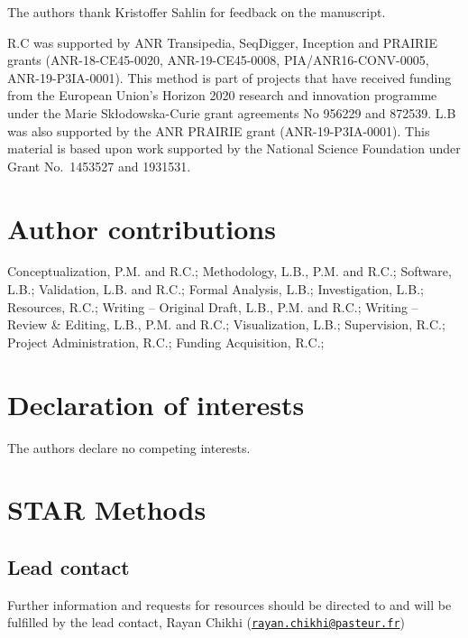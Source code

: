 \documentclass[
  11pt,
  twoside]{scrbook}
\begin{document}
The authors thank Kristoffer Sahlin for feedback on the manuscript.

R.C was supported by ANR Transipedia, SeqDigger, Inception and PRAIRIE grants (ANR-18-CE45-0020, ANR-19-CE45-0008, PIA/ANR16-CONV-0005, ANR-19-P3IA-0001). This method is part of projects that have received funding from the European Union's Horizon 2020 research and innovation programme under the Marie Skłodowska-Curie grant agreements No 956229 and 872539. L.B was also supported by the ANR PRAIRIE grant (ANR-19-P3IA-0001). This material is based upon work supported by the National Science Foundation under Grant No.~1453527 and 1931531.

\hypertarget{author-contributions}{%
\section*{Author contributions}\label{author-contributions}}

Conceptualization, P.M. and R.C.; Methodology, L.B., P.M. and R.C.; Software, L.B.; Validation, L.B. and R.C.; Formal Analysis, L.B.; Investigation, L.B.; Resources, R.C.; Writing -- Original Draft, L.B., P.M. and R.C.; Writing -- Review \& Editing, L.B., P.M. and R.C.; Visualization, L.B.; Supervision, R.C.; Project Administration, R.C.; Funding Acquisition, R.C.;

\hypertarget{declaration-of-interests}{%
\section*{Declaration of interests}\label{declaration-of-interests}}

The authors declare no competing interests.

\hypertarget{star-methods}{%
\section*{STAR Methods}\label{star-methods}}

\hypertarget{lead-contact}{%
\subsection*{Lead contact}\label{lead-contact}}

Further information and requests for resources should be directed to and will be fulfilled by the lead contact, Rayan Chikhi (\href{mailto:rayan.chikhi@pasteur.fr}{\nolinkurl{rayan.chikhi@pasteur.fr}})
\end{document}
